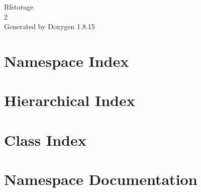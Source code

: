 \let\mypdfximage\pdfximage\def\pdfximage{\immediate\mypdfximage}\documentclass[twoside]{book}
\newcommand{\+}{\discretionary{\mbox{\scriptsize$\hookleftarrow$}}{}{}}
\newcommand{\clearemptydoublepage}{%
  \newpage{\pagestyle{empty}\cleardoublepage}%
}
\begin{document}
\hypersetup{pageanchor=false,
             bookmarksnumbered=true,
             pdfencoding=unicode
            }
\begin{titlepage}
\vspace*{7cm}
\begin{center}%
{\Large Rfstorage \\[1ex]\large 2 }\\
\vspace*{1cm}
{\large Generated by Doxygen 1.8.15}\\
\end{center}
\end{titlepage}
\clearemptydoublepage
{}
\tableofcontents
\clearemptydoublepage
{}
\hypersetup{pageanchor=true}

\chapter{Namespace Index}

\chapter{Hierarchical Index}

\chapter{Class Index}

\chapter{Namespace Documentation}














\end{document}
